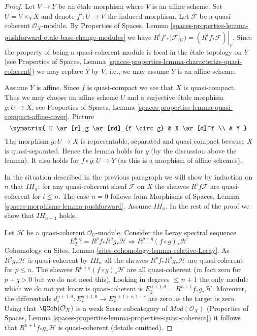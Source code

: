 \begin{proof}
Let $V \to Y$ be an \'etale morphism where $V$ is an affine scheme. Set
$U = V \times_Y X$ and denote $f' : U \to V$ the induced morphism.
Let $\mathcal{F}$ be a quasi-coherent $\mathcal{O}_X$-module. By
Properties of Spaces, Lemma
\ref{spaces-properties-lemma-pushforward-etale-base-change-modules}
we have
$R^if'_*(\mathcal{F}|_U) = (R^if_*\mathcal{F})|_V$.
Since the property of being a quasi-coherent module is local in the
\'etale topology on $Y$ (see
Properties of Spaces, Lemma
\ref{spaces-properties-lemma-characterize-quasi-coherent})
we may replace $Y$ by $V$, i.e., we may assume $Y$ is an affine scheme.

\medskip\noindent
Assume $Y$ is affine. Since $f$ is quasi-compact we see that $X$
is quasi-compact. Thus we may choose an affine scheme $U$ and a surjective
\'etale morphism $g : U \to X$, see
Properties of Spaces,
Lemma \ref{spaces-properties-lemma-quasi-compact-affine-cover}.
Picture
$$
\xymatrix{
U \ar[r]_g \ar[rd]_{f \circ g} & X \ar[d]^f \\
& Y
}
$$
The morphism $g : U \to X$ is representable, separated
and quasi-compact because $X$ is quasi-separated. Hence the lemma
holds for $g$ (by the discussion above the lemma).
It also holds for $f \circ g : U \to Y$ (as this is a morphism
of affine schemes).

\medskip\noindent
In the situation described in the previous paragraph we will show by
induction on $n$ that $IH_n$: for any quasi-coherent sheaf $\mathcal{F}$
on $X$ the sheaves $R^if\mathcal{F}$
are quasi-coherent for $i \leq n$.
The case $n = 0$ follows from
Morphisms of Spaces, Lemma \ref{spaces-morphisms-lemma-pushforward}.
Assume $IH_n$. In the rest of the proof we show that $IH_{n + 1}$ holds.

\medskip\noindent
Let $\mathcal{H}$ be a quasi-coherent $\mathcal{O}_U$-module.
Consider the Leray spectral sequence
$$
E_2^{p, q} = R^pf_* R^qg_* \mathcal{H}
\Rightarrow
R^{p + q}(f \circ g)_*\mathcal{H}
$$
Cohomology on Sites, Lemma \ref{sites-cohomology-lemma-relative-Leray}.
As $R^qg_*\mathcal{H}$ is quasi-coherent by $IH_n$ all the sheaves
$R^pf_*R^qg_*\mathcal{H}$ are quasi-coherent for $p \leq n$.
The sheaves $R^{p + q}(f \circ g)_*\mathcal{H}$ are all
quasi-coherent (in fact zero for $p + q > 0$ but we do not need this).
Looking in degrees $\leq n + 1$ the only module which we do not
yet know is quasi-coherent is $E_2^{n + 1, 0} = R^{n + 1}f_*g_*\mathcal{H}$.
Moreover, the differentials
$d_r^{n + 1, 0} : E_r^{n + 1, 0} \to E_r^{n + 1 + r, 1 - r}$
are zero as the target is zero. Using that $\QCoh(\mathcal{O}_X)$
is a weak Serre subcategory of $\textit{Mod}(\mathcal{O}_X)$
(Properties of Spaces, Lemma
\ref{spaces-properties-lemma-properties-quasi-coherent}) it
follows that $R^{n + 1}f_*g_*\mathcal{H}$
is quasi-coherent (details omitted).


\end{proof}
